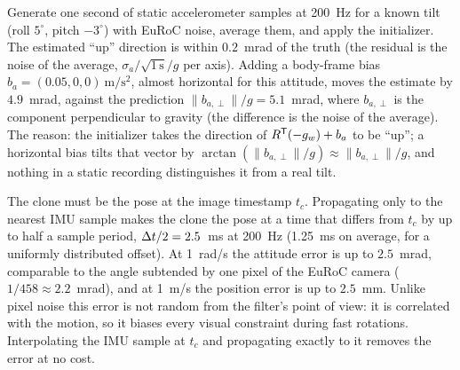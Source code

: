 \begin{solutions}
  \item Generate one second of static accelerometer samples at 200~Hz for a known tilt (roll $5^\circ$, pitch $-3^\circ$) with EuRoC noise, average them, and apply
        the initializer. The estimated ``up'' direction is within $0.2$~mrad of the truth (the residual is the noise of the average,
        $\sigma_a/\sqrt{1\,\mathrm s}/g$ per axis). Adding a body-frame bias $b_a = (0.05, 0, 0)~\mathrm{m/s^2}$, almost horizontal for this attitude, moves the estimate by
        $4.9$~mrad, against the prediction $\|b_{a,\perp}\|/g = 5.1$~mrad, where $b_{a,\perp}$ is the component perpendicular to gravity (the difference is the noise
        of the average). The reason: the initializer takes the direction of $R^{\mathsf{T}}(-g_w) + b_a$ to be ``up''; a horizontal bias tilts that vector by
        $\arctan(\|b_{a,\perp}\|/g) \approx \|b_{a,\perp}\|/g$, and nothing in a static recording distinguishes it from a real tilt.

  \item The clone must be the pose at the image timestamp $t_c$. Propagating only to the nearest IMU sample makes the clone the pose at a time that
        differs from $t_c$ by up to half a sample period, ${\Delta t}/2 = 2.5$~ms at 200~Hz (1.25~ms on average, for a uniformly distributed offset). At 1~rad/s
        the attitude error is up to $2.5$~mrad, comparable to the angle subtended by one pixel of the EuRoC camera ($1/458 \approx 2.2$~mrad), and at 1~m/s the
        position error is up to $2.5$~mm. Unlike pixel noise this error is not random from the filter's point of view: it is correlated with the motion,
        so it biases every visual constraint during fast rotations. Interpolating the IMU sample at $t_c$ and propagating exactly to it removes the error
        at no cost.
\end{solutions}
